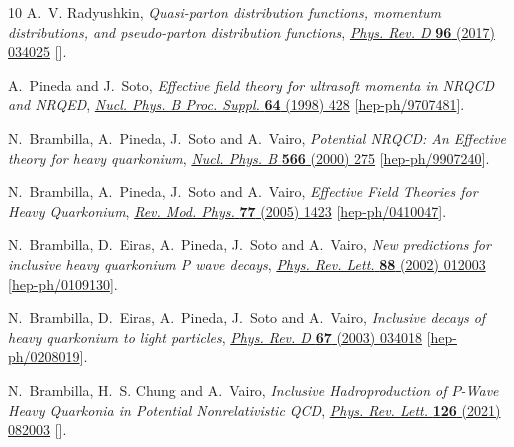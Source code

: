 \begin{thebibliography}{10}
A.~V. Radyushkin, \emph{{Quasi-parton distribution functions, momentum
  distributions, and pseudo-parton distribution functions}},
  \href{https://doi.org/10.1103/PhysRevD.96.034025}{\emph{Phys. Rev. D}
  {\bfseries 96} (2017) 034025}
  [\href{https://arxiv.org/abs/1705.01488}{{}}].

A.~Pineda and J.~Soto, \emph{{Effective field theory for ultrasoft momenta in
  NRQCD and NRQED}},
  \href{https://doi.org/10.1016/S0920-5632(97)01102-X}{\emph{Nucl. Phys. B
  Proc. Suppl.} {\bfseries 64} (1998) 428}
  [\href{https://arxiv.org/abs/hep-ph/9707481}{{\ttfamily hep-ph/9707481}}].

N.~Brambilla, A.~Pineda, J.~Soto and A.~Vairo, \emph{{Potential NRQCD: An
  Effective theory for heavy quarkonium}},
  \href{https://doi.org/10.1016/S0550-3213(99)00693-8}{\emph{Nucl. Phys. B}
  {\bfseries 566} (2000) 275}
  [\href{https://arxiv.org/abs/hep-ph/9907240}{{\ttfamily hep-ph/9907240}}].

N.~Brambilla, A.~Pineda, J.~Soto and A.~Vairo, \emph{{Effective Field Theories
  for Heavy Quarkonium}},
  \href{https://doi.org/10.1103/RevModPhys.77.1423}{\emph{Rev. Mod. Phys.}
  {\bfseries 77} (2005) 1423}
  [\href{https://arxiv.org/abs/hep-ph/0410047}{{\ttfamily hep-ph/0410047}}].

N.~Brambilla, D.~Eiras, A.~Pineda, J.~Soto and A.~Vairo, \emph{{New predictions
  for inclusive heavy quarkonium P wave decays}},
  \href{https://doi.org/10.1103/PhysRevLett.88.012003}{\emph{Phys. Rev. Lett.}
  {\bfseries 88} (2002) 012003}
  [\href{https://arxiv.org/abs/hep-ph/0109130}{{\ttfamily hep-ph/0109130}}].

N.~Brambilla, D.~Eiras, A.~Pineda, J.~Soto and A.~Vairo, \emph{{Inclusive
  decays of heavy quarkonium to light particles}},
  \href{https://doi.org/10.1103/PhysRevD.67.034018}{\emph{Phys. Rev. D}
  {\bfseries 67} (2003) 034018}
  [\href{https://arxiv.org/abs/hep-ph/0208019}{{\ttfamily hep-ph/0208019}}].

N.~Brambilla, H.~S. Chung and A.~Vairo, \emph{{Inclusive Hadroproduction of
  $P$-Wave Heavy Quarkonia in Potential Nonrelativistic QCD}},
  \href{https://doi.org/10.1103/PhysRevLett.126.082003}{\emph{Phys. Rev. Lett.}
  {\bfseries 126} (2021) 082003}
  [\href{https://arxiv.org/abs/2007.07613}{{}}].


\end{thebibliography}
